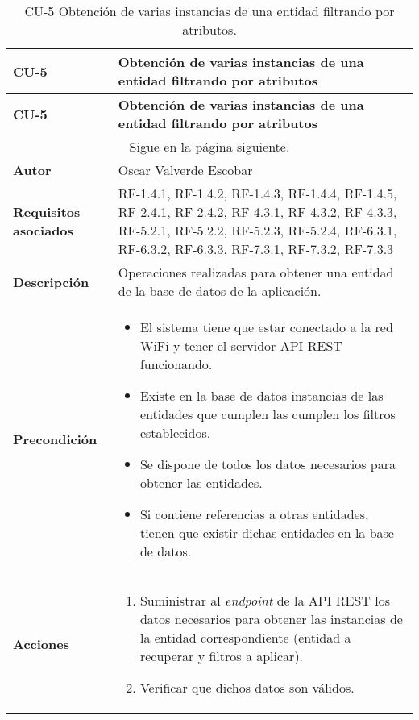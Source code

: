 \begin{longtable}{ p{} p{} }
    \caption{CU-5 Obtención de varias instancias de una entidad filtrando por atributos.}\\
    \hline
    \textbf{CU-5}    & \textbf{Obtención de varias instancias de una entidad filtrando por atributos}\\
    \hline
    \endfirsthead
    \hline
    \textbf{CU-5}    & \textbf{Obtención de varias instancias de una entidad filtrando por atributos}\\
    \hline
    \endhead
        \hline
        \multicolumn{2}{c}{Sigue en la página siguiente.}
        \endfoot
        \hline
        \endlastfoot
        
    \textbf{Versión}              & 1.0    \\
    \textbf{Autor}                & Oscar Valverde Escobar \\
    \textbf{Requisitos asociados} & RF-1.4.1, RF-1.4.2, RF-1.4.3, RF-1.4.4, RF-1.4.5, RF-2.4.1, RF-2.4.2, RF-4.3.1, RF-4.3.2, RF-4.3.3, RF-5.2.1, RF-5.2.2, RF-5.2.3, RF-5.2.4, RF-6.3.1, RF-6.3.2, RF-6.3.3, RF-7.3.1, RF-7.3.2, RF-7.3.3\\
    \textbf{Descripción}          & Operaciones realizadas para obtener una entidad de la base de datos de la aplicación.\\
    \textbf{Precondición}         & 
        \begin{itemize}
            \item El sistema tiene que estar conectado a la red WiFi y tener el servidor API REST funcionando. 
            \item Existe en la base de datos instancias de las entidades que cumplen las cumplen los filtros establecidos. 
            \item Se dispone de todos los datos necesarios para obtener las entidades.
            \item Si contiene referencias a otras entidades, tienen que existir dichas entidades en la base de datos.
        \end{itemize}\\
    \textbf{Acciones}             &
    \begin{enumerate}
        \def\labelenumi{\arabic{enumi}.}
        \tightlist
        \item Suministrar al \textit{endpoint} de la API REST los datos necesarios para obtener las instancias de la entidad correspondiente (entidad a recuperar y filtros a aplicar).
        \item Verificar que dichos datos son válidos.

\end{enumerate}
\end{longtable}

